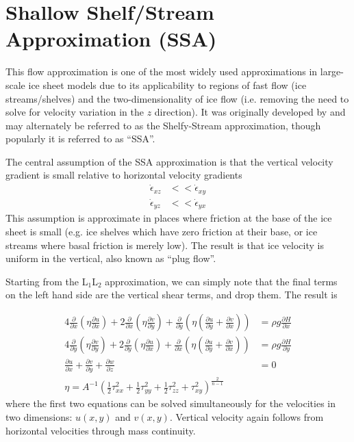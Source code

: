 \documentclass[12pt]{article}
\theoremstyle{definition}
\newcommand{\pd}[2]{\frac{\partial {#1}}{\partial {#2}}}
\begin{document}
\section{Shallow Shelf/Stream Approximation (SSA)}

This flow approximation is one of the most widely used approximations in large-scale ice sheet models due to its applicability to regions of fast flow (ice streams/shelves) and the two-dimensionality of ice flow (i.e. removing the need to solve for velocity variation in the $z$ direction). It was originally developed by \cite{MacAyeal-1989:large} and may alternately be referred to as the Shelfy-Stream approximation, though popularly it is referred to as ``SSA''.

The central assumption of the SSA approximation is that the vertical velocity gradient is small relative to horizontal velocity gradients
\begin{align}
\dot{\epsilon}_{xz} &<< \dot{\epsilon}_{xy} \\
\dot{\epsilon}_{yz} &<< \dot{\epsilon}_{yx}
\end{align}
This assumption is approximate in places where friction at the base of the ice sheet is small (e.g. ice shelves which have zero friction at their base, or ice streams where basal friction is merely low). The result is that ice velocity is uniform in the vertical, also known as ``plug flow''.

Starting from the L$_1$L$_2$ approximation, we can simply note that the final terms on the left hand side are the vertical shear terms, and drop them. The result is
\begin{shaded}
\begin{align}
4 \pd{}{x} \left(\eta \pd{u}{x} \right) + 2 \pd{}{x} \left(\eta \pd{v}{y} \right) + \pd{}{y} \left(\eta \left(\pd{u}{y} + \pd{v}{x} \right) \right) &= \rho g \pd{H}{x} \\
4 \pd{}{y} \left(\eta \pd{v}{y} \right) + 2 \pd{}{y} \left(\eta \pd{u}{x} \right) + \pd{}{x} \left(\eta \left(\pd{u}{y} + \pd{v}{x} \right) \right) &= \rho g \pd{H}{y} \\
\pd{u}{x} + \pd{v}{y} + \pd{w}{z} &= 0 \\
\eta = A^{-1} \left(\frac{1}{2} \tau_{xx}^2 + \frac{1}{2} \tau_{yy}^2 + \frac{1}{2} \tau_{zz}^2 + \tau_{xy}^2 \right)^{\frac{2}{n-1}} &
\end{align}
where the first two equations can be solved simultaneously for the velocities in two dimensions: $u(x,y)$ and $v(x,y)$. Vertical velocity again follows from horizontal velocities through mass continuity.
\end{shaded}
\end{document}
